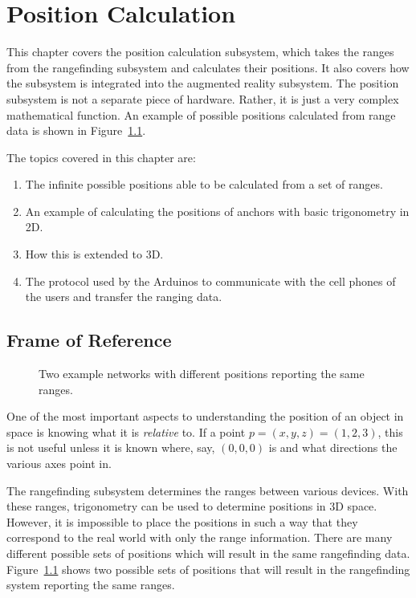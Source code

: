 

\chapter{Position Calculation} %

\label{PositionCalculation}


This chapter covers the position calculation subsystem, which takes the ranges from the rangefinding subsystem and calculates their positions. It also covers how the subsystem is integrated into the augmented reality subsystem. The position subsystem is not a separate piece of hardware. Rather, it is just a very complex mathematical function. An example of possible positions calculated from range data is shown in Figure~\ref{fig:FrameOfReference}.

The topics covered in this chapter are:
\begin{enumerate}
	\item The infinite possible positions able to be calculated from a set of ranges.
	\item An example of calculating the positions of anchors with basic trigonometry in 2D.
	\item How this is extended to 3D.
	\item The protocol used by the Arduinos to communicate with the cell phones of the users and transfer the ranging data.
\end{enumerate}

\section{Frame of Reference}
\label{FrameOfReference}
\begin{figure}
	\centering
	
	\decoRule
	\caption{Two example networks with different positions reporting the same ranges.}
	\label{fig:FrameOfReference}
\end{figure}

One of the most important aspects to understanding the position of an object in space is knowing what it is \emph{relative} to. If a point $p = (x, y, z) = (1, 2, 3)$, this is not useful unless it is known where, say, $(0, 0, 0)$ is and what directions the various axes point in.

The rangefinding subsystem determines the ranges between various devices. With these ranges, trigonometry can be used to determine positions in 3D space. However, it is impossible to place the positions in such a way that they correspond to the real world with only the range information. There are many different possible sets of positions which will result in the same rangefinding data. Figure~\ref{fig:FrameOfReference} shows two possible sets of positions that will result in the rangefinding system reporting the same ranges.

